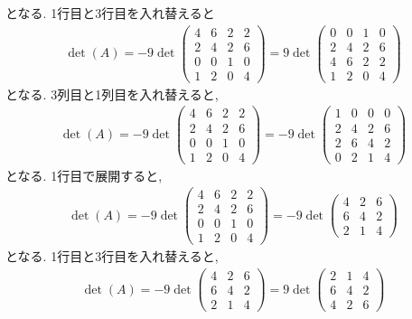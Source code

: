となる.
1行目と3行目を入れ替えると
\begin{align*}
  \det(A)
  =
  -9\det
  \begin{pmatrix}
  4&6&2&2\\
  2&4&2&6\\
  0&0&1&0\\
  1&2&0&4
  \end{pmatrix}
  =
  9\det
  \begin{pmatrix}
  0&0&1&0\\
  2&4&2&6\\
  4&6&2&2\\
  1&2&0&4
  \end{pmatrix}
\end{align*}
となる.
3列目と1列目を入れ替えると,
\begin{align*}
  \det(A)
  =
  -9\det
  \begin{pmatrix}
  4&6&2&2\\
  2&4&2&6\\
  0&0&1&0\\
  1&2&0&4
  \end{pmatrix}
  =
  -9\det
  \begin{pmatrix}
  1&0&0&0\\
  2&4&2&6\\
  2&6&4&2\\
  0&2&1&4
  \end{pmatrix}
\end{align*}
となる. 1行目で展開すると,
\begin{align*}
  \det(A)
  =
  -9\det
  \begin{pmatrix}
  4&6&2&2\\
  2&4&2&6\\
  0&0&1&0\\
  1&2&0&4
  \end{pmatrix}
  =
  -9\det
  \begin{pmatrix}
  4&2&6\\
  6&4&2\\
  2&1&4
  \end{pmatrix}
\end{align*}
となる.
1行目と3行目を入れ替えると,
\begin{align*}
  \det(A)
  =
  -9\det
  \begin{pmatrix}
  4&2&6\\
  6&4&2\\
  2&1&4
  \end{pmatrix}
  =
  9\det
  \begin{pmatrix}
    2&1&4\\
    6&4&2\\
    4&2&6
  \end{pmatrix}
\end{align*}
